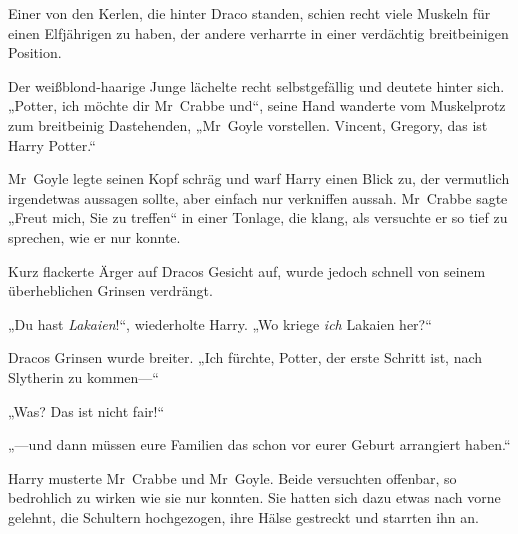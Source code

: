 Einer von den Kerlen, die hinter Draco standen, schien recht viele Muskeln für einen Elfjährigen zu haben, der andere verharrte in einer verdächtig breitbeinigen Position.

Der weißblond-haarige Junge lächelte recht selbstgefällig und deutete hinter sich. „Potter, ich möchte dir Mr~Crabbe und“, seine Hand wanderte vom Muskelprotz zum breitbeinig Dastehenden, „Mr~Goyle vorstellen. Vincent, Gregory, das ist Harry Potter.“

Mr~Goyle legte seinen Kopf schräg und warf Harry einen Blick zu, der vermutlich irgendetwas aussagen sollte, aber einfach nur verkniffen aussah. Mr~Crabbe sagte „Freut mich, Sie zu treffen“ in einer Tonlage, die klang, als versuchte er so tief zu sprechen, wie er nur konnte.

Kurz flackerte Ärger auf Dracos Gesicht auf, wurde jedoch schnell von seinem überheblichen Grinsen verdrängt.

„Du hast \emph{Lakaien}!“, wiederholte Harry. „Wo kriege \emph{ich} Lakaien her?“

Dracos Grinsen wurde breiter. „Ich fürchte, Potter, der erste Schritt ist, nach Slytherin zu kommen—“

„Was? Das ist nicht fair!“

„—und dann müssen eure Familien das schon vor eurer Geburt arrangiert haben.“

Harry musterte Mr~Crabbe und Mr~Goyle. Beide versuchten offenbar, so bedrohlich zu wirken wie sie nur konnten. Sie hatten sich dazu etwas nach vorne gelehnt, die Schultern hochgezogen, ihre Hälse gestreckt und starrten ihn an.

